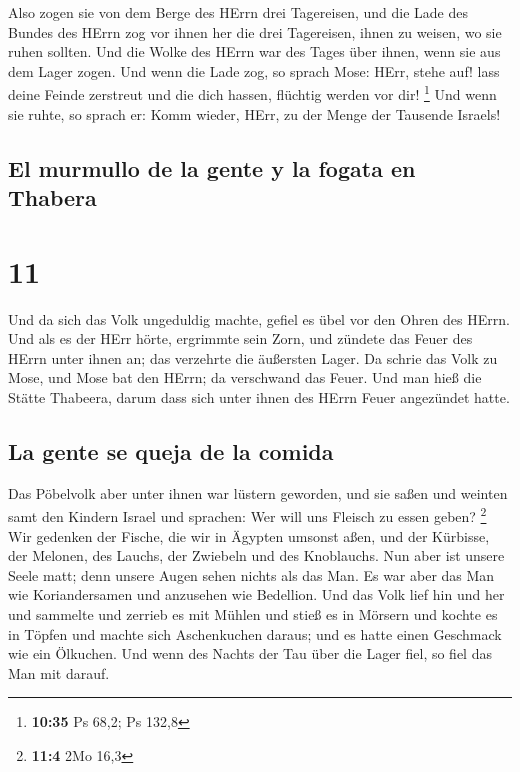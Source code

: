  Also zogen sie von dem Berge des HErrn drei Tagereisen,
und die Lade des Bundes des HErrn zog vor ihnen her die drei Tagereisen,
ihnen zu weisen, wo sie ruhen sollten.  Und die Wolke des
HErrn war des Tages über ihnen, wenn sie aus dem Lager zogen.
 Und wenn die Lade zog, so sprach Mose: HErr, stehe auf!
lass deine Feinde zerstreut und die dich hassen, flüchtig werden vor
dir! \footnote{\textbf{10:35} Ps 68,2; Ps 132,8}  Und
wenn sie ruhte, so sprach er: Komm wieder, HErr, zu der Menge der
Tausende Israels!

\hypertarget{el-murmullo-de-la-gente-y-la-fogata-en-thabera}{%
\subsection{El murmullo de la gente y la fogata en
Thabera}\label{el-murmullo-de-la-gente-y-la-fogata-en-thabera}}

\hypertarget{section-10}{%
\section{11}\label{section-10}}

 Und da sich das Volk ungeduldig machte, gefiel es übel
vor den Ohren des HErrn. Und als es der HErr hörte, ergrimmte sein Zorn,
und zündete das Feuer des HErrn unter ihnen an; das verzehrte die
äußersten Lager.  Da schrie das Volk zu Mose, und Mose bat
den HErrn; da verschwand das Feuer.  Und man hieß die
Stätte Thabeera, darum dass sich unter ihnen des HErrn Feuer angezündet
hatte.

\hypertarget{la-gente-se-queja-de-la-comida}{%
\subsection{La gente se queja de la
comida}\label{la-gente-se-queja-de-la-comida}}

 Das Pöbelvolk aber unter ihnen war lüstern geworden, und
sie saßen und weinten samt den Kindern Israel und sprachen: Wer will uns
Fleisch zu essen geben? \footnote{\textbf{11:4} 2Mo 16,3} 
Wir gedenken der Fische, die wir in Ägypten umsonst aßen, und der
Kürbisse, der Melonen, des Lauchs, der Zwiebeln und des Knoblauchs.
 Nun aber ist unsere Seele matt; denn unsere Augen sehen
nichts als das Man.  Es war aber das Man wie
Koriandersamen und anzusehen wie Bedellion.  Und das Volk
lief hin und her und sammelte und zerrieb es mit Mühlen und stieß es in
Mörsern und kochte es in Töpfen und machte sich Aschenkuchen daraus; und
es hatte einen Geschmack wie ein Ölkuchen.  Und wenn des
Nachts der Tau über die Lager fiel, so fiel das Man mit darauf.

